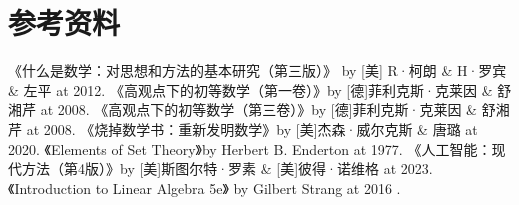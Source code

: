 \documentclass[12pt,oneside]{book}
\begin{document}
\part*{参考资料}
\begin{thebibliography}{99}
 《什么是数学：对思想和方法的基本研究（第三版）》 by [美] R·柯朗 \& H·罗宾 \&  左平  at 2012.
 《高观点下的初等数学（第一卷）》by [德]菲利克斯·克莱因 \& 舒湘芹 at 2008.
 《高观点下的初等数学（第三卷）》by [德]菲利克斯·克莱因 \& 舒湘芹 at 2008.
 《烧掉数学书：重新发明数学》by [美]杰森·威尔克斯 \& 唐璐 at 2020.
 《Elements of Set Theory》by Herbert B. Enderton at 1977.
 《人工智能：现代方法（第4版）》by [美]斯图尔特·罗素 \& [美]彼得·诺维格 at 2023.
 《Introduction to Linear Algebra 5e》 by Gilbert Strang at 2016 .
\end{thebibliography}
\end{document}
